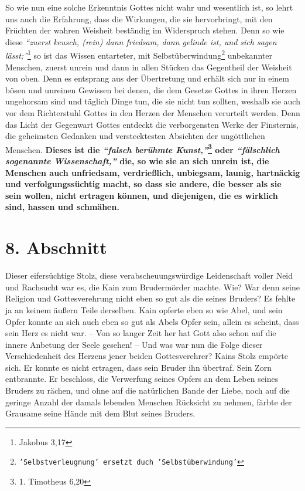 So wie nun eine solche Erkenntnis Gottes nicht wahr und wesentlich ist, so
lehrt uns auch die Erfahrung, dass die Wirkungen, die sie hervorbringt, mit den
Früchten der wahren Weisheit beständig im Widerspruch stehen. Denn so wie diese
\textit{"`zuerst keusch, (rein) dann friedsam, dann gelinde ist, und sich sagen
lässt;"'}\footnote{Jakobus 3,17}
so ist das Wissen entarteter, mit
Selbstüberwindung\footnote{\texttt{'Selbstverleugnung' ersetzt duch
'Selbstüberwindung'}}
unbekannter Menschen, zuerst unrein und dann in allen Stücken das Gegentheil
der Weisheit von oben. Denn es entsprang aus der Übertretung und erhält sich
nur in einem bösen und unreinen Gewissen bei denen, die
dem Gesetze Gottes in
ihren Herzen ungehorsam sind und täglich Dinge tun, die sie nicht tun
sollten, weshalb sie auch vor dem Richterstuhl Gottes in den Herzen der
Menschen verurteilt werden. Denn das Licht der Gegenwart Gottes entdeckt die
verborgensten Werke der Finsternis, die geheimsten
Gedanken  und verstecktesten
Absichten der ungöttlichen
Menschen. \textbf{Dieses ist die
\textit{"`falsch berühmte Kunst,"'}\footnote{1. Timotheus 6,20}
 \label{ref:07_07_aroganz}
oder \textit{"`fälschlich sogenannte
Wissenschaft,"'}
die, so wie sie an sich unrein  ist, die
Menschen auch unfriedsam, verdrießlich,
unbiegsam, launig, hartnäckig und verfolgungssüchtig macht, so dass sie andere,
die besser als sie sein wollen, nicht ertragen können, und diejenigen, die es
wirklich sind, hassen und schmähen.}

\section{8. Abschnitt} \label{kap7_ab8}

Dieser eifersüchtige Stolz, diese
verabscheuungswürdige Leidenschaft voller Neid
und Rachsucht war es, die Kain  zum
Brudermörder  machte. Wie? War denn seine
Religion und Gottesverehrung nicht eben so gut als die seines Bruders? Es fehlte
ja an keinem äußern Teile derselben. Kain  opferte eben so wie
Abel, und sein
Opfer konnte an sich auch eben so gut als Abels Opfer sein, allein es scheint,
dass sein Herz es nicht war. -- Von so langer Zeit her hat Gott also schon auf
die innere Anbetung der Seele gesehen! -- Und was war nun die Folge dieser
Verschiedenheit des Herzens jener beiden Gottesverehrer? Kains Stolz empörte
sich. Er konnte es nicht ertragen, dass sein Bruder ihn übertraf. Sein Zorn
entbrannte. Er beschloss, die Verwerfung seines Opfers an dem Leben seines
Bruders zu rächen, und ohne auf die natürlichen Bande der Liebe,
noch auf die
geringe Anzahl der damals lebenden Menschen Rücksicht zu nehmen, färbte der
Grausame seine Hände mit dem Blut seines Bruders.

